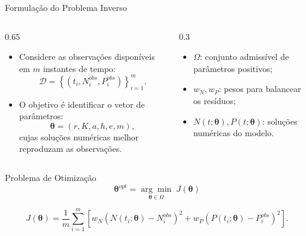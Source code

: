 \begin{frame}{Formulação do Problema Inverso}

\begin{columns}
    \begin{column}{0.65\textwidth}
        \begin{itemize}

            \item Considere as observações disponíveis em
            $m$ instantes de tempo:
            \[
            \mathcal{D}
            =
            \left\{
            (t_i,N_i^{obs},P_i^{obs})
            \right\}_{i=1}^{m}.
            \]

            \item O objetivo é identificar o vetor de parâmetros:
            \[
            \boldsymbol{\theta}
            =
            (r,K,a,h,e,m),
            \]
            cujas soluções numéricas melhor reproduzam
            as observações.

        \end{itemize}
        
    \end{column}
    \begin{column}{0.3\textwidth}
        \begin{itemize}
        \item $\Omega$: conjunto admissível de parâmetros positivos;
        \item $w_N,w_P$: pesos para balancear os resíduos;
        \item $N(t;\boldsymbol{\theta}),P(t;\boldsymbol{\theta})$:
        soluções numéricas do modelo.
        \end{itemize}
    \end{column}
\end{columns}

\begin{block}{Problema de Otimização}
        \[
        \boxed{
        \boldsymbol{\theta}^{opt}
        =
        \underset{\boldsymbol{\theta}\in\Omega}{\arg\min}
        \; J(\boldsymbol{\theta})
        }
        \]

        \vspace{-0.2cm}

        \[
        J(\boldsymbol{\theta})
        =
        \frac{1}{m}
        \sum_{i=1}^{m}
        \left[
        w_N\left(N(t_i;\boldsymbol{\theta})-N_i^{obs}\right)^2
        +
        w_P\left(P(t_i;\boldsymbol{\theta})-P_i^{obs}\right)^2
        \right].
        \]
\end{block}
\end{frame}

